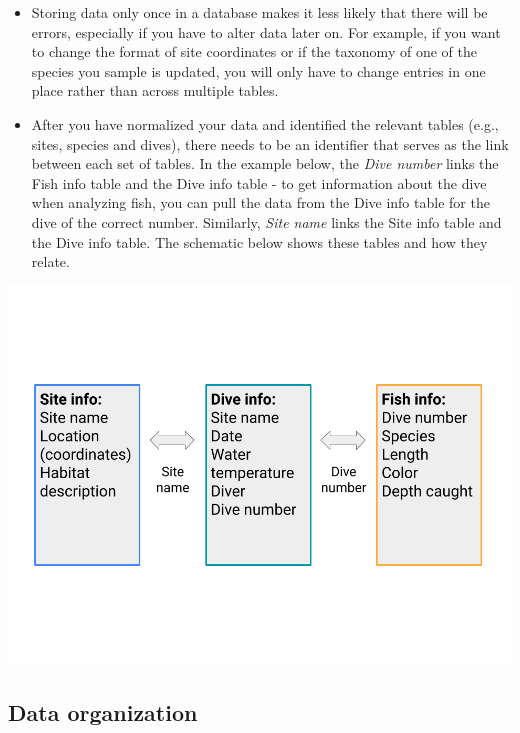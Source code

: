 \documentclass[
]{book}
\providecommand{\tightlist}{%
  \setlength{\itemsep}{0pt}\setlength{\parskip}{0pt}}
\begin{document}
\begin{enumerate}
\begin{itemize}
    \begin{itemize}
    \tightlist
    \item
      Storing data only once in a database makes it less likely that there will be errors, especially if you have to alter data later on. For example, if you want to change the format of site coordinates or if the taxonomy of one of the species you sample is updated, you will only have to change entries in one place rather than across multiple tables.
    \item
      After you have normalized your data and identified the relevant tables (e.g., sites, species and dives), there needs to be an identifier that serves as the link between each set of tables. In the example below, the \emph{Dive number} links the Fish info table and the Dive info table - to get information about the dive when analyzing fish, you can pull the data from the Dive info table for the dive of the correct number. Similarly, \emph{Site name} links the Site info table and the Dive info table. The schematic below shows these tables and how they relate.
    \end{itemize}
  \end{itemize}
\end{enumerate}

\includegraphics{images/M2S3_normalization_data_tables.png}

\hypertarget{data-organization}{%
\subsection{Data organization}\label{data-organization}}
\end{document}
